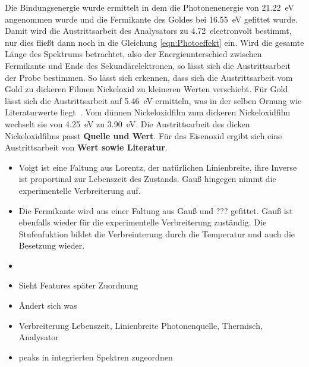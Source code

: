         Die Bindungsenergie wurde ermittelt in dem die Photonenenergie von \SI{21.22}{\electronvolt} angenommen wurde und die Fermikante des Goldes bei \SI{16.55}{\electronvolt} gefittet wurde.
        Damit wird die Austrittsarbeit des Analysators zu \SI{4.72}{electronvolt} bestimmt, nur dies fließt dann noch in die Gleichung \ref{eqn:Photoeffekt} ein.
        Wird die gesamte Länge des Spektrums betrachtet, also der Energieunterschied zwischen Fermikante und Ende des Sekundärelektronen, so lässt sich die Austrittsarbeit der Probe bestimmen.
        So lässt sich erkennen, dass sich die Austrittsarbeit vom Gold zu dickeren Filmen Nickeloxid zu kleineren Werten verschiebt.
        Für Gold lässt sich die Austrittsarbeit auf \SI{5.46}{\electronvolt} ermitteln, was in der selben Ornung wie Literaturwerte liegt~\cite{Hüfner}.
        Vom dünnen Nickeloxidfilm zum dickeren Nickeloxidfilm wechselt sie von \SI{4.25}{\electronvolt} zu \SI{3.90}{\electronvolt}.
        Die Austrittsarbeit des dicken Nickeloxidfilms passt \textbf{Quelle und Wert}.
        Für das Eisenoxid ergibt sich eine Austrittsarbeit von \textbf{Wert sowie Literatur}.
        \begin{itemize}
            \item Voigt ist eine Faltung aus Lorentz, der natürlichen Linienbreite, ihre Inverse ist proportinal zur Lebenszeit des Zustands. Gauß hingegen nimmt die experimentelle Verbreiterung auf.
            \item Die Fermikante wird aus einer Faltung aus Gauß und ??? gefittet. Gauß ist ebenfalls wieder für die experimentelle Verbreiterung zuständig. Die Stufenfuktion bildet die Verbreiuterung durch die Temperatur und auch die Besetzung wieder.
            \item 
        \end{itemize}

        \begin{itemize}
            \item Sieht Features später Zuordnung
            \item Ändert sich was
            \item Verbreiterung Lebenszeit, Linienbreite Photonenquelle, Thermisch, Analysator
            \item peaks in integrierten Spektren zugeordnen
        \end{itemize}


